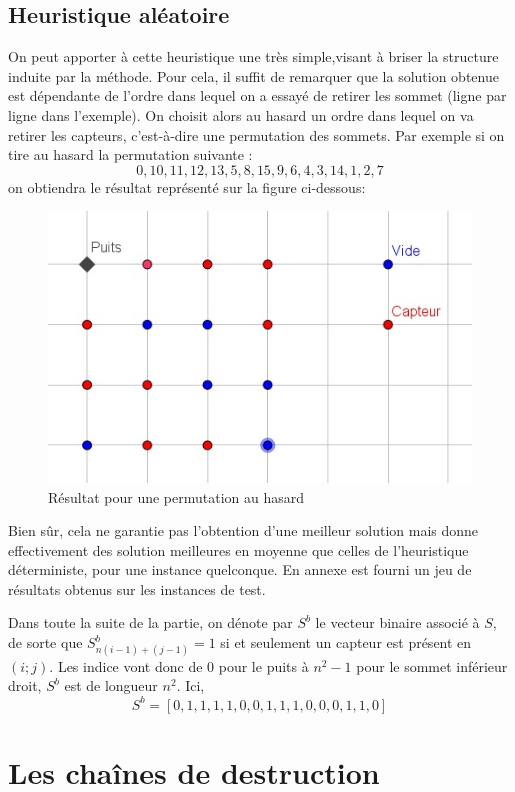 \documentclass[12pt,a4paper]{article}
\begin{document}
\subsection{Heuristique aléatoire} 
On peut apporter à cette heuristique une très simple,visant à briser la structure induite par la méthode. Pour cela, il suffit de remarquer que la solution obtenue est  dépendante de l'ordre dans lequel on a essayé de retirer les sommet (ligne par ligne dans l'exemple). On choisit alors au hasard un ordre dans lequel on va retirer les capteurs, c'est-à-dire une permutation des sommets. Par exemple si on tire au hasard la permutation suivante : \[0,10,11,12,13,5,8,15,9,6,4,3,14,1,2,7\] on obtiendra le résultat représenté sur la figure ci-dessous:
\begin{figure}[!h]
\center
\includegraphics[scale=1]{Images/4_1_1_random.jpg}
\caption{Résultat pour une permutation au hasard}
\end{figure}

Bien sûr, cela ne garantie pas l'obtention d'une meilleur solution mais donne effectivement des solution meilleures en moyenne que celles de l'heuristique déterministe, pour une instance quelconque. En annexe est fourni un jeu de résultats obtenus sur les instances de test.

Dans toute la suite de la partie, on dénote par $S^b$ le vecteur binaire associé à $S$, de sorte que $S^b_{n(i-1)+(j-1)}=1$ si et seulement un capteur est présent en $(i;j)$. Les indice vont donc de $0$ pour le  puits à $n^2-1$ pour le sommet inférieur droit, $S^b$ est de longueur $n^2$. Ici, 
\[S^b=[0,1,1,1,1,0,0,1,1,1,0,0,0,1,1,0]\]

\section{Les chaînes de destruction}
\end{document}
